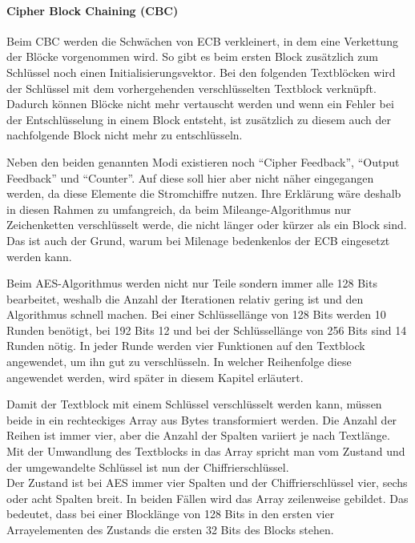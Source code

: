   \paragraph{Cipher Block Chaining (CBC)}
   Beim CBC werden die Schwächen von ECB verkleinert, in dem eine Verkettung der Blöcke vorgenommen
   wird. So gibt es beim ersten Block zusätzlich zum Schlüssel noch einen Initialisierungsvektor. Bei den
   folgenden Textblöcken wird der Schlüssel mit dem vorhergehenden verschlüsselten Textblock
   verknüpft. Dadurch können Blöcke nicht mehr vertauscht werden und wenn ein Fehler bei der Entschlüsselung
   in einem Block entsteht, ist zusätzlich zu diesem auch der nachfolgende Block nicht mehr
   zu entschlüsseln.
   
  Neben den beiden genannten Modi existieren noch ``Cipher Feedback'', ``Output Feedback'' und
  ``Counter''. Auf diese soll hier aber nicht näher eingegangen werden, da diese Elemente die
  Stromchiffre nutzen. Ihre Erklärung wäre deshalb in diesen Rahmen zu umfangreich, da beim
  Mileange-Algorithmus nur Zeichenketten verschlüsselt werde, die nicht länger oder kürzer als ein Block
  sind. Das ist auch der Grund, warum bei Milenage bedenkenlos der ECB eingesetzt werden kann.
  
  Beim AES-Algorithmus werden nicht nur Teile sondern immer alle 128 Bits bearbeitet, weshalb die
  Anzahl der Iterationen relativ gering ist und den Algorithmus schnell machen. Bei einer Schlüssellänge
  von 128 Bits werden 10 Runden benötigt, bei 192 Bits 12 und bei der Schlüssellänge von 256 Bits
  sind 14 Runden nötig. In jeder Runde werden vier Funktionen auf den Textblock angewendet, um
  ihn gut zu verschlüsseln. In welcher Reihenfolge diese angewendet werden, wird später
  in diesem Kapitel erläutert.
  
  Damit der Textblock mit einem Schlüssel verschlüsselt werden kann, müssen beide in ein rechteckiges
  Array aus Bytes transformiert werden. Die Anzahl der Reihen ist immer vier, aber die Anzahl der Spalten
  variiert je nach Textlänge. Mit der Umwandlung des Textblocks in das Array spricht man vom Zustand
  und der umgewandelte Schlüssel ist nun der Chiffrierschlüssel. \\
  Der Zustand ist bei AES immer vier Spalten und der Chiffrierschlüssel vier, sechs oder acht Spalten
  breit. In beiden Fällen wird das Array zeilenweise gebildet. Das bedeutet, dass bei einer Blocklänge von
  128 Bits in den ersten vier Arrayelementen des Zustands die ersten 32 Bits des Blocks stehen.
  
